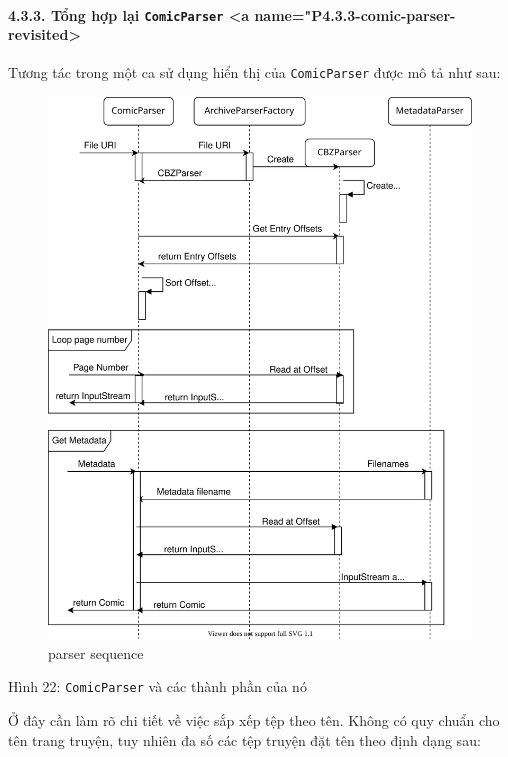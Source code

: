 \documentclass[
]{article}
\begin{document}
\hypertarget{tux1ed5ng-hux1ee3p-lux1ea1i-comicparser-a-namep4.3.3-comic-parser-revisited}{%
\paragraph{\texorpdfstring{4.3.3. Tổng hợp lại \texttt{ComicParser}
\textless a
name="P4.3.3-comic-parser-revisited\textgreater{}}{4.3.3. Tổng hợp lại ComicParser \textless a name="P4.3.3-comic-parser-revisited\textgreater{}}}\label{tux1ed5ng-hux1ee3p-lux1ea1i-comicparser-a-namep4.3.3-comic-parser-revisited}}

Tương tác trong một ca sử dụng hiển thị của \texttt{ComicParser} được mô
tả như sau:

\begin{figure}
\centering
\includegraphics{../images/parser_sequence.svg}
\caption{parser sequence}
\end{figure}

Hình 22: \texttt{ComicParser} và các thành phần của nó

Ở đây cần làm rõ chi tiết về việc sắp xếp tệp theo tên. Không có quy
chuẩn cho tên trang truyện, tuy nhiên đa số các tệp truyện đặt tên theo
định dạng sau:
\end{document}
